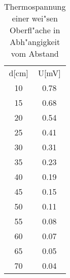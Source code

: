 \begin{table}
\begin{center}
\begin{tabular}{c|c}
d[cm] & U[mV] \\
10 & 0.78 \\
15 & 0.68 \\
20 & 0.54 \\
25 & 0.41 \\
30 & 0.31 \\
35 & 0.23 \\
40 & 0.19 \\
45 & 0.15 \\
50 & 0.11 \\
55 & 0.08 \\
60 & 0.07 \\
65 & 0.05 \\
70 & 0.04 \\
\end{tabular}
\caption[Thermospannung]{Thermospannung einer wei"sen Oberfl"ache in Abh"angigkeit vom Abstand}
\label{abstand}
\end{center}
\end{table}

